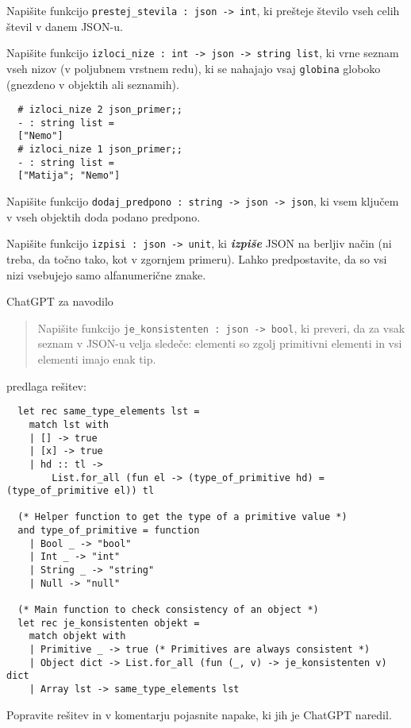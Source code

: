 \documentclass[arhiv]{../izpit}
\begin{document}
\podnaloga
Napišite funkcijo \verb|prestej_stevila : json -> int|, ki prešteje število vseh celih števil v danem JSON-u.

\podnaloga
Napišite funkcijo \verb|izloci_nize : int -> json -> string list|, ki vrne seznam vseh nizov (v poljubnem vrstnem redu), ki se nahajajo vsaj \verb|globina| globoko (gnezdeno v objektih ali seznamih).

\begin{verbatim}
  # izloci_nize 2 json_primer;;
  - : string list =
  ["Nemo"]
  # izloci_nize 1 json_primer;;
  - : string list =
  ["Matija"; "Nemo"]
\end{verbatim}

\podnaloga
Napišite funkcijo \verb|dodaj_predpono : string -> json -> json|, ki vsem ključem v vseh objektih doda podano predpono.

\podnaloga
Napišite funkcijo \verb|izpisi : json -> unit|, ki \textbf{\emph{izpiše}} JSON na berljiv način (ni treba, da točno tako, kot v zgornjem primeru). Lahko predpostavite, da so vsi nizi vsebujejo samo alfanumerične znake.

\podnaloga
ChatGPT za navodilo
\begin{quote}
  Napišite funkcijo \verb|je_konsistenten : json -> bool|, ki preveri, da za vsak seznam v JSON-u velja sledeče: elementi so zgolj primitivni elementi in vsi elementi imajo enak tip.  
\end{quote}
predlaga rešitev:
\begin{verbatim}
  let rec same_type_elements lst =
    match lst with
    | [] -> true
    | [x] -> true
    | hd :: tl ->
        List.for_all (fun el -> (type_of_primitive hd) = (type_of_primitive el)) tl

  (* Helper function to get the type of a primitive value *)
  and type_of_primitive = function
    | Bool _ -> "bool"
    | Int _ -> "int"
    | String _ -> "string"
    | Null -> "null"

  (* Main function to check consistency of an object *)
  let rec je_konsistenten objekt =
    match objekt with
    | Primitive _ -> true (* Primitives are always consistent *)
    | Object dict -> List.for_all (fun (_, v) -> je_konsistenten v) dict
    | Array lst -> same_type_elements lst
\end{verbatim}

Popravite rešitev in v komentarju pojasnite napake, ki jih je ChatGPT naredil.

\end{document}
